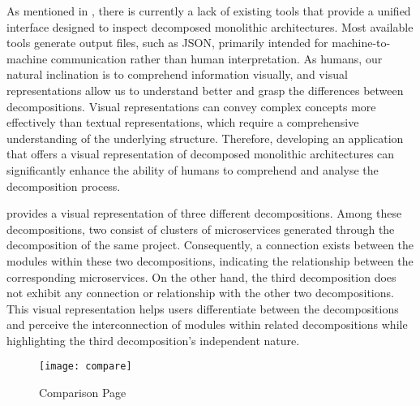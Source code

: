 As mentioned in , there is currently a lack of existing tools
that provide a unified interface designed to inspect decomposed monolithic
architectures. Most available tools generate output files, such as JSON,
primarily intended for machine-to-machine communication rather than human
interpretation. As humans, our natural inclination is to comprehend information
visually, and visual representations allow us to understand better and grasp
the differences between decompositions. Visual representations can convey
complex concepts more effectively than textual representations, which require a
comprehensive understanding of the underlying structure. Therefore, developing
an application that offers a visual representation of decomposed monolithic
architectures can significantly enhance the ability of humans to comprehend and
analyse the decomposition process.

 provides a visual representation of three different
decompositions. Among these decompositions, two consist of clusters of
microservices generated through the decomposition of the same project.
Consequently, a connection exists between the modules within these two
decompositions, indicating the relationship between the corresponding
microservices. On the other hand, the third decomposition does not exhibit any
connection or relationship with the other two decompositions. This visual
representation helps users differentiate between the decompositions and
perceive the interconnection of modules within related decompositions while
highlighting the third decomposition's independent nature.

\begin{figure*}[!htb]
  \centering
  \texttt{[image: compare]}
  \caption{Comparison Page}
  \label{fig:comparison_page}
\end{figure*}

